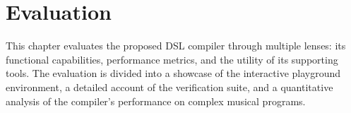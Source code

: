 \chapter{Evaluation}\label{ch:evaluation}

This chapter evaluates the proposed DSL compiler through multiple lenses: its functional capabilities, performance metrics, and the utility of its supporting tools.
The evaluation is divided into a showcase of the interactive playground environment, a detailed account of the verification suite, and a quantitative analysis of the compiler's performance on complex musical programs.

% 
% 
